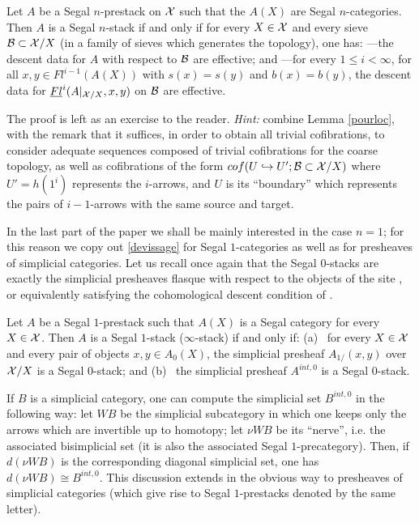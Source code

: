 \begin{proposition}
\label{conditiond}
Let $A$ be a Segal $n$-prestack on ${\cal X}$ such that the $A(X)$ are Segal
$n$-categories. Then $A$ is a Segal $n$-stack if and only if for every
$X\in {\cal X}$ and every sieve ${\cal B} \subset {\cal X} /X$ (in a family of sieves which
generates the topology), one has:
\newline
---the descent data for $A$ with respect to ${\cal B}$ are effective; and
\newline
---for every $1\leq i < \infty$, for all $x,y\in Fl^{i-1}(A(X))$ with
$s(x)=s(y)$ and $b(x)=b(y)$, the descent data for
$\underline{Fl}^i(A|_{{\cal X} /X}, x,y)$ on ${\cal B}$ are effective.
\end{proposition}
The proof is left as an exercise to the reader. {\em Hint:} combine Lemma
\ref{pourloc}, with the remark that it suffices, in order
to obtain all trivial cofibrations, to consider adequate sequences composed of
trivial cofibrations for the coarse topology, as well as cofibrations of the
form $cof(U\hookrightarrow U'; {\cal B} \subset {\cal X} /X)$ where $U'= h(1^i)$
represents the $i$-arrows, and $U$ is its ``boundary'' which represents the
pairs of $i-1$-arrows with the same source and target.
\eop




In the last part of the paper we shall be mainly interested in the case $n=1$;
for this reason we copy out \ref{devissage} for Segal $1$-categories as well as
for presheaves of simplicial categories. Let us recall once again that the
Segal $0$-stacks are exactly the simplicial presheaves flasque with respect to
the objects of the site \cite{Jardine}, or equivalently satisfying the
cohomological descent condition of \cite{Thomason} \cite{TravauxThomason}.

\begin{corollary}
Let $A$ be a Segal $1$-prestack such that $A(X)$ is a Segal category for every
$X\in {\cal X}$. Then $A$ is a Segal $1$-stack ($\infty$-stack) if and only if:
\newline
(a) \, for every $X\in {\cal X}$ and every pair of objects $x,y\in A_0(X)$, the
simplicial presheaf $A_{1/}(x,y)$ over ${\cal X} /X$ is a Segal $0$-stack; and
\newline
(b) \, the simplicial presheaf $A^{int, 0}$ is a Segal $0$-stack.
\end{corollary}
\eop

If $B$ is a simplicial category, one can compute the simplicial set
$B^{int, 0}$ in the following way: let $WB$ be the simplicial subcategory in
which one keeps only the arrows which are invertible up to homotopy; let
$\nu WB$ be its ``nerve'', i.e. the associated bisimplicial set (it is also
the associated Segal $1$-precategory). Then, if $d(\nu WB)$ is the corresponding
diagonal simplicial set, one has $d(\nu WB)\cong B^{int, 0}$.
This discussion extends in the obvious way to presheaves of simplicial
categories (which give rise to Segal $1$-prestacks denoted by the same
letter).

